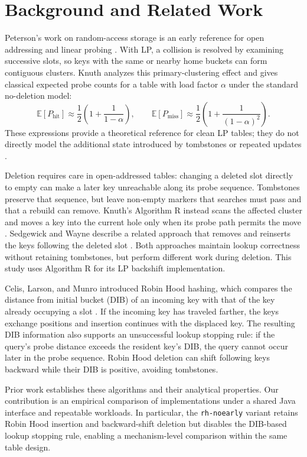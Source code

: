 \documentclass[conference]{IEEEtran}
\begin{document}
\section{Background and Related Work}
Peterson's work on random-access storage is an early reference for open
addressing and linear probing \cite{peterson}. With LP, a collision is resolved
by examining successive slots, so keys with the same or nearby home buckets
can form contiguous clusters. Knuth analyzes this primary-clustering effect
and gives classical expected probe counts for a table with load factor
$\alpha$ under the standard no-deletion model:
\begin{equation}
    \mathbb{E}[P_{\mathrm{hit}}] \approx
    \frac{1}{2}\left(1 + \frac{1}{1-\alpha}\right), \qquad
    \mathbb{E}[P_{\mathrm{miss}}] \approx
    \frac{1}{2}\left(1 + \frac{1}{(1-\alpha)^2}\right).
\end{equation}
These expressions provide a theoretical reference for clean LP tables; they
do not directly model the additional state introduced by tombstones or
repeated updates \cite{knuth}.

Deletion requires care in open-addressed tables: changing a deleted slot
directly to empty can make a later key unreachable along its probe sequence.
Tombstones preserve that sequence, but leave non-empty markers that searches
must pass and that a rebuild can remove. Knuth's Algorithm R instead scans
the affected cluster and moves a key into the current hole only when its
probe path permits the move \cite{knuth}. Sedgewick and Wayne describe a
related approach that removes and reinserts the keys following the deleted
slot \cite{sedgewick}. Both approaches maintain lookup correctness without
retaining tombstones, but perform different work during deletion. This study
uses Algorithm R for its LP backshift implementation.

Celis, Larson, and Munro introduced Robin Hood hashing, which compares the
distance from initial bucket (DIB) of an incoming key with that of the key
already occupying a slot \cite{celis}. If the incoming key has traveled
farther, the keys exchange positions and insertion continues with the
displaced key. The resulting DIB information also supports an unsuccessful
lookup stopping rule: if the query's probe distance exceeds the resident
key's DIB, the query cannot occur later in the probe sequence. Robin Hood
deletion can shift following keys backward while their DIB is positive,
avoiding tombstones.

Prior work establishes these algorithms and their analytical properties.
Our contribution is an empirical comparison of implementations under a
shared Java interface and repeatable workloads. In particular, the
\texttt{rh-noearly} variant retains Robin Hood insertion and backward-shift
deletion but disables the DIB-based lookup stopping rule, enabling a
mechanism-level comparison within the same table design.
\end{document}
